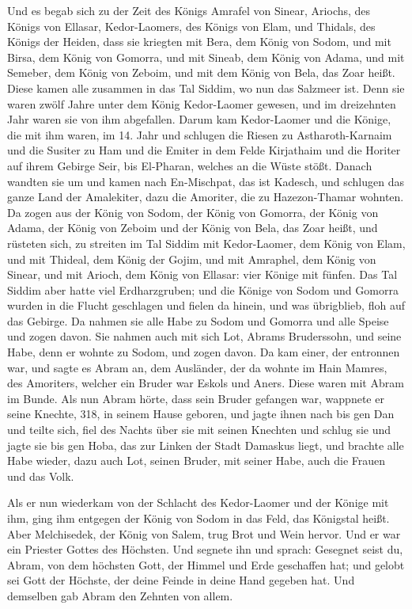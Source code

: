  Und es begab sich zu der Zeit des Königs Amrafel von
Sinear, Ariochs, des Königs von Ellasar, Kedor-Laomers, des Königs von
Elam, und Thidals, des Königs der Heiden,  dass sie
kriegten mit Bera, dem König von Sodom, und mit Birsa, dem König von
Gomorra, und mit Sineab, dem König von Adama, und mit Semeber, dem König
von Zeboim, und mit dem König von Bela, das Zoar heißt. 
Diese kamen alle zusammen in das Tal Siddim, wo nun das Salzmeer ist.
 Denn sie waren zwölf Jahre unter dem König Kedor-Laomer
gewesen, und im dreizehnten Jahr waren sie von ihm abgefallen.
 Darum kam Kedor-Laomer und die Könige, die mit ihm waren,
im 14. Jahr und schlugen die Riesen zu Astharoth-Karnaim und die Susiter
zu Ham und die Emiter in dem Felde Kirjathaim  und die
Horiter auf ihrem Gebirge Seir, bis El-Pharan, welches an die Wüste
stößt.  Danach wandten sie um und kamen nach En-Mischpat,
das ist Kadesch, und schlugen das ganze Land der Amalekiter, dazu die
Amoriter, die zu Hazezon-Thamar wohnten.  Da zogen aus der
König von Sodom, der König von Gomorra, der König von Adama, der König
von Zeboim und der König von Bela, das Zoar heißt, und rüsteten sich, zu
streiten im Tal Siddim  mit Kedor-Laomer, dem König von
Elam, und mit Thideal, dem König der Gojim, und mit Amraphel, dem König
von Sinear, und mit Arioch, dem König von Ellasar: vier Könige mit
fünfen.  Das Tal Siddim aber hatte viel Erdharzgruben;
und die Könige von Sodom und Gomorra wurden in die Flucht geschlagen und
fielen da hinein, und was übrigblieb, floh auf das Gebirge.
 Da nahmen sie alle Habe zu Sodom und Gomorra und alle
Speise und zogen davon.  Sie nahmen auch mit sich Lot,
Abrams Bruderssohn, und seine Habe, denn er wohnte zu Sodom, und zogen
davon.  Da kam einer, der entronnen war, und sagte es
Abram an, dem Ausländer, der da wohnte im Hain Mamres, des Amoriters,
welcher ein Bruder war Eskols und Aners. Diese waren mit Abram im Bunde.
 Als nun Abram hörte, dass sein Bruder gefangen war,
wappnete er seine Knechte, 318, in seinem Hause geboren, und jagte ihnen
nach bis gen Dan  und teilte sich, fiel des Nachts über
sie mit seinen Knechten und schlug sie und jagte sie bis gen Hoba, das
zur Linken der Stadt Damaskus liegt,  und brachte alle
Habe wieder, dazu auch Lot, seinen Bruder, mit seiner Habe, auch die
Frauen und das Volk.

 Als er nun wiederkam von der Schlacht des Kedor-Laomer
und der Könige mit ihm, ging ihm entgegen der König von Sodom in das
Feld, das Königstal heißt.  Aber Melchisedek, der König
von Salem, trug Brot und Wein hervor. Und er war ein Priester Gottes des
Höchsten.  Und segnete ihn und sprach: Gesegnet seist du,
Abram, von dem höchsten Gott, der Himmel und Erde geschaffen hat;
 und gelobt sei Gott der Höchste, der deine Feinde in
deine Hand gegeben hat. Und demselben gab Abram den Zehnten von allem.

